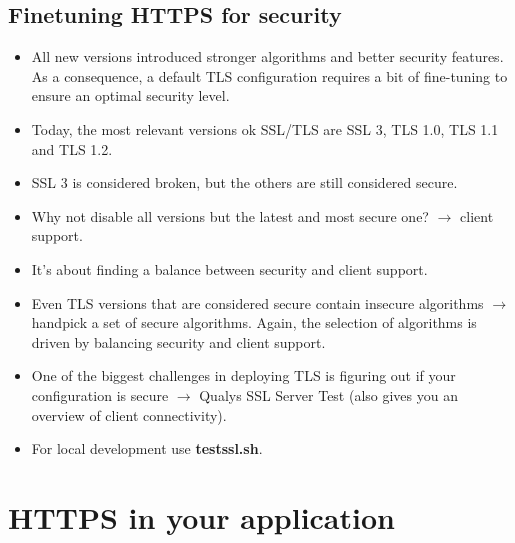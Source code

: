 \documentclass[../main.tex]{subfiles}
\begin{document}
\subsection{Finetuning HTTPS for security}
\begin{itemize}
\item All new versions introduced stronger algorithms and better security features. As a consequence, a default TLS configuration requires a bit of fine-tuning to ensure an optimal security level.
\item Today, the most relevant versions ok SSL/TLS are SSL 3, TLS 1.0, TLS 1.1 and TLS 1.2.
\item SSL 3 is considered broken, but the others are still considered secure.
\item Why not disable all versions but the latest and most secure one? $\rightarrow$ client support.
\item It's about finding a balance between security and client support.
\item Even TLS versions that are considered secure contain insecure algorithms $\rightarrow$ handpick a set of secure algorithms. Again, the selection of algorithms is driven by balancing security and client support.
\item One of the biggest challenges in deploying TLS is figuring out if your configuration is secure $\rightarrow$  Qualys SSL Server Test (also gives you an overview of client connectivity).
\item For local development use \textbf{testssl.sh}.
\end{itemize}
\clearpage

\section{HTTPS in your application}
\end{document}

